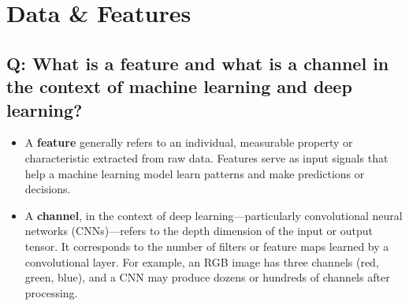 \section{Data \& Features}

\subsection*{Q: What is a feature and what is a channel in the context of machine learning and deep learning?}
\begin{itemize}
	\item A \textbf{feature} generally refers to an individual, measurable property or characteristic extracted from raw data. Features serve as input signals that help a machine learning model learn patterns and make predictions or decisions.

	\item A \textbf{channel}, in the context of deep learning—particularly convolutional neural networks (CNNs)—refers to the depth dimension of the input or output tensor. It corresponds to the number of filters or feature maps learned by a convolutional layer. For example, an RGB image has three channels (red, green, blue), and a CNN may produce dozens or hundreds of channels after processing.
\end{itemize}
